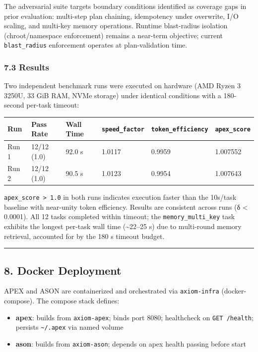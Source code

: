 \documentclass[
]{article}
\providecommand{\tightlist}{%
  \setlength{\itemsep}{0pt}\setlength{\parskip}{0pt}}
\begin{document}
The adversarial suite targets boundary conditions identified as coverage
gaps in prior evaluation: multi-step plan chaining, idempotency under
overwrite, I/O scaling, and multi-key memory operations. Runtime
blast-radius isolation (chroot/namespace enforcement) remains a
near-term objective; current \texttt{blast\_radius} enforcement operates
at plan-validation time.

\subsubsection{7.3 Results}\label{73-results}

Two independent benchmark runs were executed on hardware (AMD Ryzen 3
3250U, 33 GiB RAM, NVMe storage) under identical conditions with a
180-second per-task timeout:

\begin{longtable}[]{@{}llllll@{}}
\toprule\noalign{}
Run & Pass Rate & Wall Time & \texttt{speed\_factor} &
\texttt{token\_efficiency} & \texttt{apex\_score} \\
\midrule\noalign{}
\endhead
\bottomrule\noalign{}
\endlastfoot
Run 1 & 12/12 (1.0) & 92.0 s & 1.0117 & 0.9959 & 1.007552 \\
Run 2 & 12/12 (1.0) & 90.5 s & 1.0123 & 0.9954 & 1.007643 \\
\end{longtable}

\texttt{apex\_score\ \textgreater{}\ 1.0} in both runs indicates
execution faster than the 10s/task baseline with near-unity token
efficiency. Results are consistent across runs (δ \textless{} 0.0001).
All 12 tasks completed within timeout; the \texttt{memory\_multi\_key}
task exhibits the longest per-task wall time (\textasciitilde22--25 s)
due to multi-round memory retrieval, accounted for by the 180 s timeout
budget.

\begin{center}\rule{0.5\linewidth}{0.5pt}\end{center}

\subsection{8. Docker Deployment}\label{8-docker-deployment}

APEX and ASON are containerized and orchestrated via
\texttt{axiom-infra} (docker-compose). The compose stack defines:

\begin{itemize}
\tightlist
\item
  \textbf{apex}: builds from \texttt{axiom-apex}; binds port 8080;
  healthcheck on \texttt{GET\ /health}; persists
  \texttt{\textasciitilde{}/.apex} via named volume
\item
  \textbf{ason}: builds from \texttt{axiom-ason}; depends on apex health
  passing before start
\end{itemize}
\end{document}
